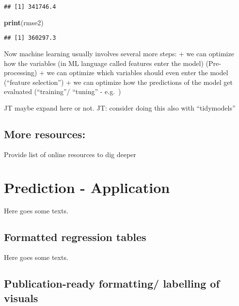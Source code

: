 \documentclass[
]{book}
\newenvironment{Shaded}{\begin{snugshade}}{\end{snugshade}}
\newcommand{\FunctionTok}[1]{\textcolor[rgb]{0.13,0.29,0.53}{\textbf{#1}}}
\newcommand{\NormalTok}[1]{#1}
\begin{document}
\begin{verbatim}
## [1] 341746.4
\end{verbatim}

\begin{Shaded}
\begin{Highlighting}[]
\FunctionTok{print}\NormalTok{(rmse2)}
\end{Highlighting}
\end{Shaded}

\begin{verbatim}
## [1] 360297.3
\end{verbatim}

Now machine learning usually involves several more steps:
+ we can optimize how the variables (in ML language called features enter the model) (Pre-processing)
+ we can optimize which variables should even enter the model (``feature selection'')
+ we can optimize how the predictions of the model get evaluated (``training''/ ``tuning'' - e.g.~)

JT maybe expand here or not.
JT: consider doing this also with ``tidymodels''

\hypertarget{more-resources}{%
\section{More resources:}\label{more-resources}}

Provide list of online resources to dig deeper

\hypertarget{pm-a}{%
\chapter{Prediction - Application}\label{pm-a}}

Here goes some texts.

\hypertarget{formatted-regression-tables}{%
\section{Formatted regression tables}\label{formatted-regression-tables}}

Here goes some texts.

\hypertarget{publication-ready-formatting-labelling-of-visuals}{%
\section{Publication-ready formatting/ labelling of visuals}\label{publication-ready-formatting-labelling-of-visuals}}
\end{document}
